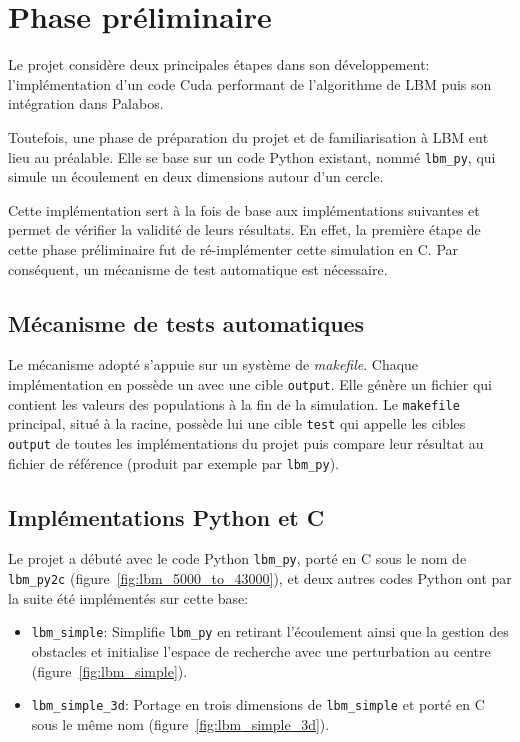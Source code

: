 \section{Phase préliminaire}
Le projet considère deux principales étapes dans son développement: l'implémentation d'un code Cuda performant de l'algorithme de \ac{LBM}  puis son intégration dans Palabos.

Toutefois, une phase de préparation du projet et de familiarisation à \ac{LBM}  eut lieu au préalable. Elle se base sur un code Python existant, nommé \texttt{lbm\_py}, qui simule un écoulement en deux dimensions autour d'un cercle. 

Cette implémentation sert à la fois de base aux implémentations suivantes et permet de vérifier la validité de leurs résultats. En effet, la première étape de cette phase préliminaire fut de ré-implémenter cette simulation en C. Par conséquent, un mécanisme de test automatique est nécessaire.

\subsection{Mécanisme de tests automatiques} \label{title-tests}

Le mécanisme adopté s'appuie sur un système de \textit{makefile}. Chaque implémentation en possède un avec une cible \texttt{output}. Elle génère un fichier qui contient les valeurs des populations à la fin de la simulation. Le \texttt{makefile} principal, situé à la racine, possède lui une cible \texttt{test} qui appelle les cibles \texttt{output} de toutes les implémentations du projet puis compare leur résultat au fichier de référence (produit par exemple par \texttt{lbm\_py}).

\subsection{Implémentations Python et C}  \label{title-implementation_python_C}

Le projet a débuté avec le code Python \texttt{lbm\_py}, porté en C sous le nom de \texttt{lbm\_py2c} (figure~\ref{fig:lbm_5000_to_43000}), et deux autres codes Python ont par la suite été implémentés sur cette base:
\begin{itemize}
\item \texttt{lbm\_simple}: Simplifie \texttt{lbm\_py} en retirant l'écoulement ainsi que la gestion des obstacles et initialise l'espace de recherche avec une perturbation au centre (figure~\ref{fig:lbm_simple}). 
\item \texttt{lbm\_simple\_3d}: Portage en trois dimensions de \texttt{lbm\_simple} et porté en C sous le même nom (figure~\ref{fig:lbm_simple_3d}). 
\end{itemize}

